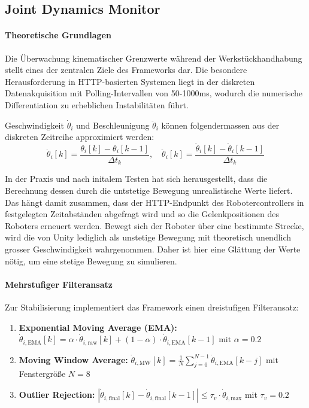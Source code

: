 \subsection{Joint Dynamics Monitor}
\label{sssec:joint_dynamics_monitor}

\paragraph{Theoretische Grundlagen} Die Überwachung kinematischer Grenzwerte
während der Werkstückhandhabung stellt eines der zentralen Ziele des Frameworks dar. Die besondere Herausforderung in HTTP-basierten Systemen
liegt in der diskreten Datenakquisition mit Polling-Intervallen von 50-1000ms,
wodurch die numerische Differentiation zu erheblichen Instabilitäten
führt.

Geschwindigkeit $\dot{\theta}_i$ und Beschleunigung $\ddot{\theta}_i$ können folgendermassen aus der diskreten Zeitreihe approximiert werden:
\begin{equation}
	\dot{\theta}_i[k] = \frac{\theta_i[k] - \theta_i[k-1]}{\Delta t_k}, \quad
	\ddot{\theta}_i[k] = \frac{\dot{\theta}_i[k] - \dot{\theta}_i[k-1]}{\Delta t_k}
	\label{eq:discrete_derivatives}
\end{equation}

In der Praxis und nach initalem Testen hat sich herausgestellt, dass die
Berechnung dessen durch die untstetige Bewegung unrealistische Werte liefert.
Das hängt damit zusammen, dass der HTTP-Endpunkt des Robotercontrollers in
festgelegten Zeitabständen abgefragt wird und so die Gelenkpositionen des
Roboters erneuert werden. Bewegt sich der Roboter über eine bestimmte Strecke,
wird die von Unity lediglich als unstetige Bewegung mit theoretisch unendlich
grosser Geschwindigkeit wahrgenommen. Daher ist hier eine Glättung der Werte
nötig, um eine stetige Bewegung zu simulieren.

\paragraph{Mehrstufiger Filteransatz}
Zur Stabilisierung implementiert das Framework einen dreistufigen Filteransatz:

\begin{enumerate}
	\item \textbf{Exponential Moving Average (EMA):}
	      $\dot{\theta}_{i,\text{EMA}}[k] = \alpha \cdot \dot{\theta}_{i,\text{raw}}[k] + (1-\alpha) \cdot \dot{\theta}_{i,\text{EMA}}[k-1]$ mit $\alpha = 0.2$

	\item \textbf{Moving Window Average:}
	      $\dot{\theta}_{i,\text{MW}}[k] = \frac{1}{N} \sum_{j=0}^{N-1} \dot{\theta}_{i,\text{EMA}}[k-j]$ mit Fenstergröße $N = 8$

	\item \textbf{Outlier Rejection:}
	      $|\dot{\theta}_{i,\text{final}}[k] - \dot{\theta}_{i,\text{final}}[k-1]| \leq \tau_v \cdot \dot{\theta}_{i,\text{max}}$ mit $\tau_v = 0.2$
\end{enumerate}

